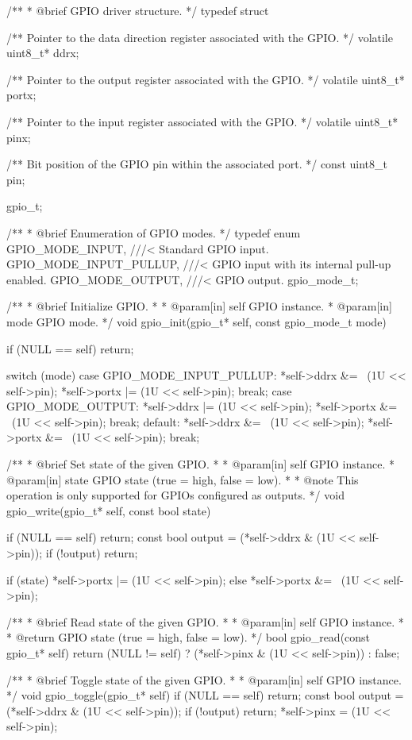 \begin{ccode}
/**
 * @brief GPIO driver structure.
 */
typedef struct
{
    /** Pointer to the data direction register associated with the GPIO. */
    volatile uint8_t* ddrx;

    /** Pointer to the output register associated with the GPIO. */
    volatile uint8_t* portx;

    /** Pointer to the input register associated with the GPIO. */
    volatile uint8_t* pinx;

    /** Bit position of the GPIO pin within the associated port. */
    const uint8_t pin;
} gpio_t;

/**
 * @brief Enumeration of GPIO modes.
 */
typedef enum
{
    GPIO_MODE_INPUT,        ///< Standard GPIO input.
    GPIO_MODE_INPUT_PULLUP, ///< GPIO input with its internal pull-up enabled.
    GPIO_MODE_OUTPUT,       ///< GPIO output.
} gpio_mode_t;

/**
 * @brief Initialize GPIO.
 *
 * @param[in] self GPIO instance.
 * @param[in] mode GPIO mode.
 */
void gpio_init(gpio_t* self, const gpio_mode_t mode)
{
    if (NULL == self) { return; }

    switch (mode)
    {
        case GPIO_MODE_INPUT_PULLUP:
            *self->ddrx &= ~(1U << self->pin);
            *self->portx |= (1U << self->pin);
            break;
        case GPIO_MODE_OUTPUT:
            *self->ddrx |= (1U << self->pin);
            *self->portx &= ~(1U << self->pin);
            break;
        default:
            *self->ddrx &= ~(1U << self->pin);
            *self->portx &= ~(1U << self->pin);
            break;
    }
}

/**
 * @brief Set state of the given GPIO.
 *
 * @param[in] self GPIO instance.
 * @param[in] state GPIO state (true = high, false = low).
 *
 * @note This operation is only supported for GPIOs configured as outputs.
 */
void gpio_write(gpio_t* self, const bool state)
{
    if (NULL == self) { return; }
    const bool output = (*self->ddrx & (1U << self->pin));
    if (!output) { return; }

    if (state) { *self->portx |= (1U << self->pin); }
    else { *self->portx &= ~(1U << self->pin); }
}

/**
 * @brief Read state of the given GPIO.
 *
 * @param[in] self GPIO instance.
 *
 * @return GPIO state (true = high, false = low).
 */
bool gpio_read(const gpio_t* self)
{
    return (NULL != self) ? (*self->pinx & (1U << self->pin)) : false;
}

/**
 * @brief Toggle state of the given GPIO.
 *
 * @param[in] self GPIO instance.
 */
void gpio_toggle(gpio_t* self)
{
    if (NULL == self) { return; }
    const bool output = (*self->ddrx & (1U << self->pin));
    if (!output) { return; }
    *self->pinx = (1U << self->pin);
}
\end{ccode}

